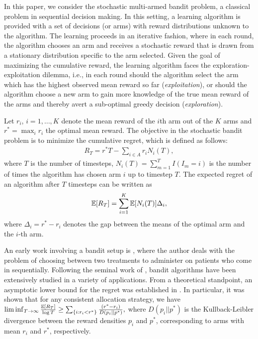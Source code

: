 In this paper, we consider the stochastic multi-armed bandit problem, a classical problem in sequential decision making. In this setting,  a learning algorithm is provided with a set of decisions (or arms) with reward distributions unknown to the algorithm. The learning proceeds in an iterative fashion, where in each round, the algorithm chooses an arm and receives a stochastic reward that is drawn from a stationary distribution specific to the arm selected.  
Given the goal of maximizing the cumulative reward, the learning algorithm faces the exploration-exploitation dilemma, i.e., in each round should the algorithm select the arm which has the highest observed mean reward so far 
(\textit{exploitation}), or should the algorithm choose a new arm to gain more knowledge of the true mean reward of the arms and thereby avert a sub-optimal greedy decision (\textit{exploration}). 

Let $r_i$, $i=1,\ldots,K$ denote the mean reward of the $i$th arm out of the $K$ arms and $r^* = \max_i r_i$ the optimal mean reward. The objective in the stochastic bandit problem is to minimize the cumulative regret, which is defined as follows:
\begin{align*}
R_{T}=r^{*}T - \sum_{i\in A} r_{i}N_{i}(T),
\end{align*}
where $T$ is the number of timesteps, $N_{i}(T)=\sum_{m=1}^T I(I_m=i)$ is the number of times the algorithm has chosen arm $i$ up to timestep $T$.
The expected regret of an algorithm after $T$ timesteps can be written as
\begin{align*}
\mathbb{E}[R_{T}]= \sum_{i=1}^K \mathbb{E}[N_i(T)] \Delta_i,
\end{align*}
where $\Delta_{i}=r^{*}-r_{i}$ denotes the gap between the means of the optimal arm and the $i$-th arm. 


                                                                                                                                          


An early work involving a bandit setup is \citet{thompson1933likelihood}, where the author deals with  the problem of choosing between two treatments to administer on patients who come in sequentially. Following the seminal work of \citet{robbins1952some}, bandit algorithms have been extensively studied in a variety of applications. 
From a theoretical standpoint, an asymptotic lower bound for the regret was established in \citet{lai1985asymptotically}. In particular, it was shown that for any consistent allocation strategy, we have
$\liminf_{T \to \infty}\frac{\mathbb{E}[R_{T}]}{\log T}\geq\sum_{\{i:r_{i}<r^{*}\}}\frac{(r^{*}-r_{i})}{D(p_{i}||p^{*})},$
where $D(p_{i}||p^{*})$ is the Kullback-Leibler divergence between the reward densities $p_{i}$ and $p^{*}$, corresponding to arms with mean $r_{i}$ and $r^{*}$, respectively.

